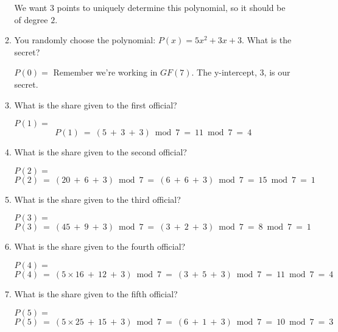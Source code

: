 \documentclass[11pt, preview]{standalone} %
\begin{document}
\begin{enumerate}
\begin{enumerate}
\begin{Freeform}{2}
 \Solution We want $3$ points to uniquely determine this polynomial, so it should be of degree $2$.
 \end{Freeform}

 \item You randomly choose the polynomial: $P(x) = 5x^2 + 3x + 3$. What is the secret?
 \begin{Freeform}{3}
 $P(0) = $
 \Hint Remember we're working in $GF(7)$.
 \Solution The y-intercept, $3$, is our secret.
 \end{Freeform}
 
 \item What is the share given to the first official?
 \begin{Freeform}{4}
 $P(1) = $ 
 \Solution $$P(1)\ =\ (5\ +\ 3\ +\ 3) \bmod 7\ =\ 11 \bmod 7\ =\ 4$$
 \end{Freeform}
 
 \item What is the share given to the second official?
 \begin{Freeform}{1}
 $P(2) = $
 \Solution $$P(2)\ =\ (20\ +\ 6\ +\ 3) \bmod 7\ =\ (6\ +\ 6\ +\ 3) \bmod 7\ =\ 15 \bmod 7\ =\ 1$$
 \end{Freeform}
 
\item What is the share given to the third official?
 \begin{Freeform}{1}
 $P(3) = $
 \Solution $$P(3)\ =\ (45\ +\ 9\ +\ 3) \bmod 7\ =\ (3\ +\ 2\ +\ 3) \bmod 7\ =\ 8 \bmod 7\ =\ 1$$
 \end{Freeform}
 
  \item What is the share given to the fourth official?
 \begin{Freeform}{4}
 $P(4) = $
 \Solution $$P(4)\ =\ (5 \times 16\ +\ 12\ +\ 3) \bmod 7\ =\ (3\ +\ 5\ +\ 3) \bmod 7\ =\ 11 \bmod 7\ =\ 4$$
 \end{Freeform}
 
  \item What is the share given to the fifth official?
 \begin{Freeform}{3}
 $P(5) = $
 \Solution $$P(5)\ =\ (5 \times 25\ +\ 15\ +\ 3) \bmod 7\ =\ (6\ +\ 1\ +\ 3) \bmod 7\ =\ 10 \bmod 7\ =\ 3$$
 \end{Freeform}
 

\end{enumerate}
\end{enumerate}
\end{document}
